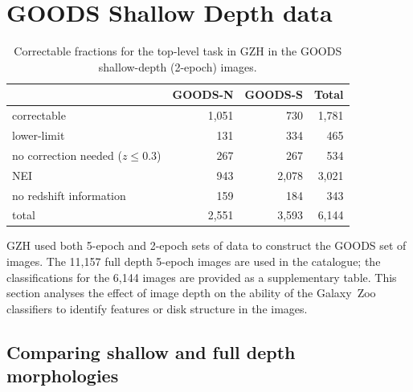 \documentclass[a4paper,fleqn,usenatbib]{mnras}
\begin{document}



\newpage
\clearpage

\appendix

\section{GOODS Shallow Depth data}


\begin{table}
\caption{Correctable fractions for the top-level task in GZH in the GOODS
shallow-depth (2-epoch) images. \label{tbl:goods_shallow_categories}}
\begin{tabular}{lrr|r}
\hline\hline
                                   & GOODS-N & GOODS-S & Total \\
\hline
correctable                        & 1,051   &   730   & 1,781 \\
lower-limit                        &   131   &   334   &   465 \\
no correction needed ($z \le 0.3$) &   267   &   267   &   534 \\ 
NEI                                &   943   & 2,078   & 3,021 \\
no redshift information            &   159   &   184   &   343 \\
\hline
total                              & 2,551   & 3,593   & 6,144 \\
\hline\hline
\end{tabular}
\end{table}

GZH used both 5-epoch and 2-epoch sets of data to construct the GOODS set of
images. The 11,157 full depth 5-epoch images are used in the \main{} catalogue; the
classifications for the 6,144 \goods{} images are provided as a
supplementary table. This section analyses the effect of image depth on the
ability of the Galaxy~Zoo classifiers to identify features or disk structure in the images. 

\subsection{Comparing shallow and full depth morphologies}\label{ssec:depth_comparison}
\end{document}
